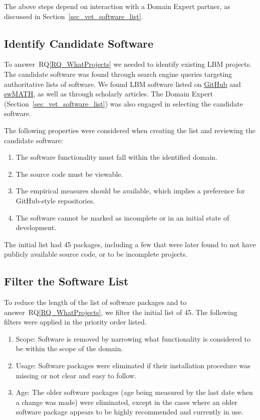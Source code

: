 \documentclass[final, 3p, times, authoryear]{elsarticle}
\newcommand{\rqref}[1]{RQ\ref{#1}}
\begin{document}
The above steps depend on interaction with a Domain Expert partner, as discussed
in Section~\ref{sec_vet_software_list}.

\subsection{Identify Candidate Software} \label{identifysoftware}

To answer~\rqref{RQ_WhatProjects} we needed to identify existing LBM projects.
The candidate software was found through search engine queries targeting
authoritative lists of software. We found LBM software listed on
\href{https://github.com/} {GitHub} and \href{https://swmath.org/} {swMATH}, as
well as through scholarly articles. The Domain Expert
(Section~\ref{sec_vet_software_list}) was also engaged in selecting the
candidate software.

The following properties were considered when creating the list and reviewing
the candidate software:

\begin{enumerate}
	\item The software functionality must fall within the identified domain.
	\item The source code must be viewable.
	\item The empirical measures should be available, which implies a preference
	for GitHub-style repositories.
	\item The software cannot be marked as incomplete or in an initial state of
	development.
\end{enumerate}

The initial list had 45 packages, including a few that were later found to not
have publicly available source code, or to be incomplete projects.

\subsection{Filter the Software List} \label{filtersoftware}

To reduce the length of the list of software packages and to
answer~\rqref{RQ_WhatProjects}, we filter the initial list of 45.  The following
filters were applied in the priority order listed.

\begin{enumerate}
	\item Scope: Software is removed by narrowing what functionality is
	considered to be within the scope of the domain.
	\item Usage: Software packages were eliminated if their installation
	procedure was missing or not clear and easy to follow.
	\item Age: The older software packages (age being measured by the last date
	when a change was made) were eliminated, except in the cases where an older
	software package appears to be highly recommended and currently in use. 
\end{enumerate}
\end{document}
